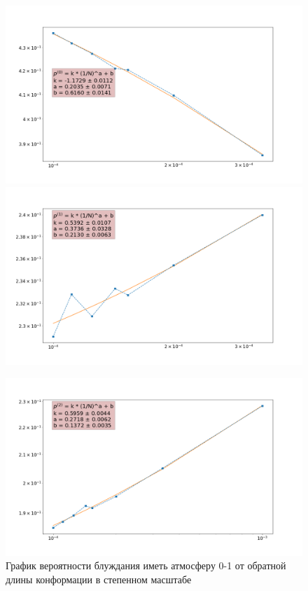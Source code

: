 \begin{figure}[h]
\centering
\begin{minipage}{0.49\textwidth}
\includegraphics[width=\textwidth]{Sections/Images_2/p0_res.png}
\includegraphics[width=\textwidth]{Sections/Images_2/p1_res.png}
\caption{График вероятности блуждания иметь атмосферу 0-1 от обратной длины конформации в степенном масштабе}
\label{fig:p_01_loglog}
\end{minipage}
\hfill
\begin{minipage}{0.49\textwidth}
\centering
\includegraphics[width=\textwidth]{Sections/Images_2/p2_res.png}

\end{minipage}
\end{figure}
